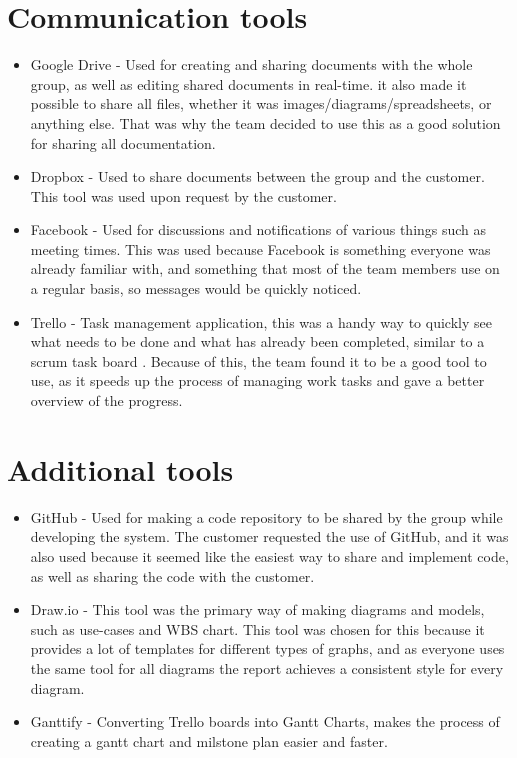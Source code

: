 \section{Communication tools}
\label{sec:communication tools}

\begin{itemize}
	\item Google Drive \cite{es10} - Used for creating and sharing documents with the whole group, as well as editing shared documents in real-time. it also made it possible to share all files, whether it was images/diagrams/spreadsheets, or anything else. That was why the team decided to use this as a good solution for sharing all documentation.
	\item Dropbox \cite{es11} - Used to share documents between the group and the customer. This tool was used upon request by the customer.
	\item Facebook \cite{es13} - Used for discussions and notifications of various things such as meeting times. This was used because Facebook is something everyone was already familiar with, and something that most of the team members use on a regular basis, so messages would be quickly noticed.
	\item Trello \cite{es15} - Task management application, this was a handy way to quickly see what needs to be done and what has already been completed, similar to a scrum task board . Because of this, the team found it to be a good tool to use, as it speeds up the process of managing work tasks and gave a better overview of the progress.
\end{itemize}

\section{Additional tools}
\label{sec:additional_tools}

\begin{itemize}
	\item GitHub \cite{es12} - Used for making a code repository to be shared by the group while developing the system. The customer requested the use of GitHub, and it was also used because it seemed like the easiest way to share and implement code, as well as sharing the code with the customer.
	\item Draw.io \cite{es14} - This tool was the primary way of making diagrams and models, such as use-cases and WBS chart. This tool was chosen for this because it provides a lot of templates for different types of graphs, and as everyone uses the same tool for all diagrams the report achieves a consistent style for every diagram.
	\item Ganttify \cite{RG1} - Converting Trello boards into Gantt Charts, makes the process of creating a gantt chart and milstone plan easier and faster.
\end{itemize}

\cleardoublepage